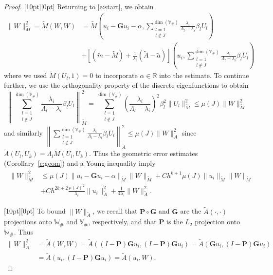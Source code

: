 \documentclass{siamart0516}
\newcommand{\bG}{\ensuremath{\boldsymbol G}}
\newcommand{\bP}{\ensuremath{\boldsymbol P}}
\newcommand{\step}[1]{\noindent\raisebox{1.5pt}[10pt][0pt]{\tiny\framebox{$#1$}}\xspace}
\numberwithin{equation}{section}
\numberwithin{theorem}{section}
\numberwithin{figure}{section}
\begin{document}
\begin{proof}
\step{3} Returning to \eqref{e:start}, we obtain
\begin{align*}
\|W\|_{\widetilde M}^2 = \widetilde M(W,W) &=  \widetilde M\left(u_i-\bG u_i -\alpha,\sum_{\substack{l=1\\l\not \in J}}^{\dim(\mathbb V_\#)} \frac{\lambda_i}{\Lambda_{l}-\lambda_i}\beta_l U_{l}\right) \\
&+  \left [(\tilde m-\widetilde M) + \frac{1}{\lambda_i} (\widetilde A-\tilde a) \right ]\left(u_i,\sum_{\substack{l=1\\ l \not \in J}}^{\dim(\mathbb V_\#)} \frac{\lambda_i}{\Lambda_{l}-\lambda_i}\beta_l U_{l}\right) 
\end{align*}
where we used $\widetilde M(U_l,1)=0$ to incorporate $\alpha \in \mathbb R$ into the estimate.
To continue further, we use the orthogonality property of the discrete eigenfunctions to obtain
$$
\left \| \sum_{\substack{l=1\\ l \not \in J}}^{\dim(\mathbb V_\#)} \frac{\lambda_i}{\Lambda_{l}-\lambda_i}\beta_l U_{l} \right \|_{\widetilde M}^2 = \sum_{\substack{l=1\\ l \not \in J}}^{\dim(\mathbb V_\#)} \left(\frac{\lambda_i}{\Lambda_{l}-\lambda_i}\right)^2\beta_l^2 \| U_l \|_{\widetilde M}^2\leq  \mu(J) \| W \|_{\widetilde M}^2
$$
and similarly $
\left\| \sum_{\substack{l=1\\ l \not \in J}}^{\dim(\mathbb V_\#)} \frac{\lambda_i}{\Lambda_{l}-\lambda_i}\beta_l U_{l} \right\|_{\widetilde A}^2 \leq   \mu(J) \| W \|_{\widetilde A}^2$ since $\tilde A(U_l,U_k) = \Lambda_l \widetilde M(U_l,U_k)$.  
Thus the geometric error estimates (Corollary~\ref{c:geom}) and a Young inequality imply
\begin{align}
\begin{aligned}
\|W\|_{\widetilde M}^2 &\leq  \mu(J)\|u_i-\bG u_i-\alpha\|_{\widetilde M}\|W\|_{\widetilde M}+  C h^{k+1}\mu (J)\|u_i\|_{\widetilde M}\|W\|_{\widetilde M}\\
&+ C h^{2k+2}\frac{\mu(J)^2}{\lambda_i}\|u_i\|_{\widetilde A}^2 
+ \frac{1}{4\lambda_i}\|W\|^2_{\widetilde A}.
\end{aligned}
\label{vmk2}
\end{align}


\step{4} To bound $\|W\|_{\tilde A}$, we recall that $\bP\circ \bG$ and $\bG$ are the $\widetilde A(\cdot, \cdot)$ projections onto $\mathbb{W}_\#$ and $\mathbb{V}_\#$, respectively, and that ${\bP}$ is the $L_2$ projection onto $\mathbb{W}_\#$.  Thus 
\begin{align*}
\|W\|_{\widetilde A}^2 &= \widetilde A(W,W) = \widetilde A((I-\bP)\bG u_i,(I-\bP)\bG u_i) = \widetilde A(\bG u_i, (I-\bP)\bG u_i) \\
&= \widetilde A(u_i,(I-\bP)\bG u_i)= \widetilde A(u_i,W).
\end{align*}


\end{proof}
\end{document}
